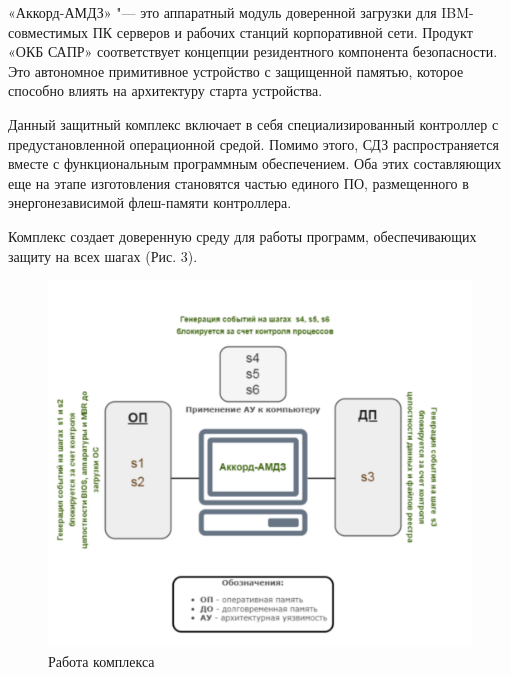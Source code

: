 «Аккорд-АМДЗ» "--- это аппаратный модуль доверенной загрузки
для IBM-совместимых ПК серверов и рабочих станций корпоративной сети. Продукт 
«ОКБ САПР» соответствует концепции резидентного компонента безопасности. Это 
автономное примитивное устройство с защищенной памятью, которое способно влиять 
на архитектуру старта устройства.

Данный защитный комплекс включает в себя специализированный
контроллер с предустановленной операционной средой. Помимо этого, 
СДЗ распространяется вместе с функциональным программным обеспечением. Оба этих
составляющих еще на этапе изготовления становятся частью единого ПО, 
размещенного в энергонезависимой флеш-памяти контроллера.

Комплекс создает доверенную среду для работы программ, обеспечивающих защиту 
на всех шагах (Рис. 3).

\begin{figure}[H]
  \centering
  \includegraphics[width=1\textwidth]{pict/9}
  \caption{Работа комплекса}
  \label{fig:56}
\end{figure}



